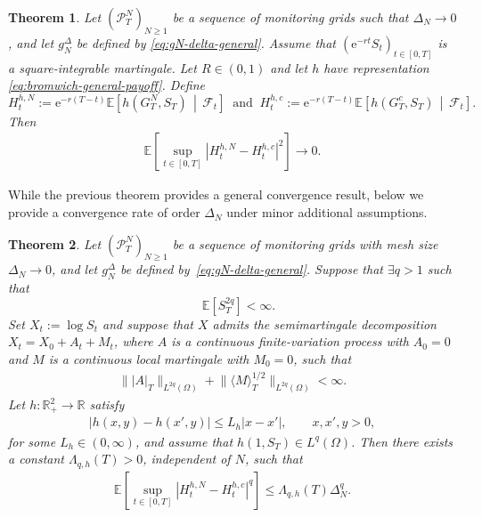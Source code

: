 \documentclass[10pt,a4paper,reqno]{amsart}
\theoremstyle{plain}
\newtheorem{theorem}{Theorem}[section]
\theoremstyle{definition}
\theoremstyle{remark}
\theoremstyle{example}
\begin{document}
\begin{theorem}\label{thm:general-price-process-convergence}
    Let $(\mathcal P_T^N)_{N\geq1}$ be a sequence of monitoring grids
    such that $\Delta_N\to0$, and let $g_N^\Delta$ be defined by
    \eqref{eq:gN-delta-general}. Assume that $(\mathrm e^{-rt}S_t)_{t\in[0,T]}$ is a square-integrable martingale. Let $R\in(0,1)$ and let $h$ have representation \eqref{eq:bromwich-general-payoff}. Define
    \[
        H_t^{h,N} := \mathrm e^{-r(T-t)} \mathbb E\left[ h(G_T^N,S_T) \,\middle|\, \mathcal F_t
        \right] \ \text{ and } \ H_t^{h,c} := \mathrm e^{-r(T-t)} \mathbb E\left[ h(G_T^c,S_T) \,\middle|\, \mathcal F_t \right].
    \]
    Then 
        \begin{align}\label{eq:price-process-L2-convergence}
            \mathbb E\left[ \sup_{t\in[0,T]} |H_t^{h,N}-H_t^{h,c}|^2 \right] \longrightarrow 0.
        \end{align}
\end{theorem}

While the previous theorem provides a general convergence result, below we provide a convergence rate of order $\Delta_N$ under minor additional assumptions.

\begin{theorem}\label{thm:lipschitz-payoff-convergence-rate}
    Let $(\mathcal P_T^N)_{N\geq1}$ be a sequence of monitoring grids with mesh size $\Delta_N\to0$, and let $g_N^\Delta$ be defined by~\eqref{eq:gN-delta-general}. Suppose that $\exists q>1$ such that
    \[
        \quad \mathbb E[S_T^{2q}]<\infty.
    \]
    Set $X_t:=\log S_t$ and suppose that $X$ admits the semimartingale decomposition $X_t=X_0+A_t+M_t$, where $A$ is a continuous finite-variation process with $A_0=0$ and $M$ is a continuous local martingale with $M_0=0$, such that
    \begin{align}\label{eq:log-semimartingale-rate-assumption}
        \big\||A|_T\big\|_{L^{2q}(\Omega)} + \big\|\langle M\rangle_T^{1/2}\big\|_{L^{2q}(\Omega)} < \infty.
    \end{align}
    Let $h:\mathbb R_+^2\longrightarrow \mathbb R$ satisfy
    \begin{align}\label{eq:lipschitz-first-variable}
        |h(x,y)-h(x',y)| \leq L_h|x-x'|, \qquad x,x',y>0,
    \end{align}
    for some $L_h \in (0,\infty)$, and assume that $h(1,S_T)\in L^q(\Omega)$. Then there exists a constant $\Lambda_{q,h}(T)>0$, independent of $N$, such that
    \begin{align}\label{eq:lipschitz-price-process-rate}
        \mathbb E\left[ \sup_{t\in[0,T]} |H_t^{h,N}-H_t^{h,c}|^q \right] \leq \Lambda_{q,h}(T)\Delta_N^q.
    \end{align}
\end{theorem}
\end{document}
